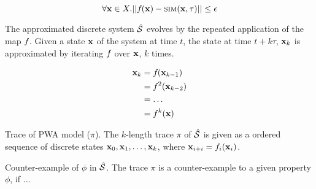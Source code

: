 \begin{equation}
    \forall \mathbf{x} \in X.
        ||f_{}(\mathbf{x}) - \mbox{\sc sim}(\mathbf{x}, \tau)|| \le \epsilon
\end{equation}

The approximated discrete system $\hat{\mathcal{S}}$ evolves by the repeated
application of the map $f_{}$. Given a state $\mathbf{x}$ of the
system at time $t$, the state at time $t + k\tau$, $\mathbf{x}_k$ is
approximated by iterating $f_{}$ over $\mathbf{x}$, $k$ times.

\begin{align}
    \mathbf{x}_k &= f_{}(\mathbf{x}_{k-1}) \nonumber\\
          &= f_{}^2(\mathbf{x}_{k-2}) \nonumber\\
          &= \ldots \nonumber\\
          &= f_{}^k(\mathbf{x})
\end{align}

\begin{definition}{Trace of PWA model ($\pi$)}. The $k$-length trace
$\pi$ of $\hat{\mathcal{S}}$ is given as a ordered sequence of discrete
states $\mathbf{x}_0, \mathbf{x}_1, \ldots, \mathbf{x}_k$, where $\mathbf{x}_{i+i} = f_{i}(\mathbf{x}_i)$.
\end{definition}

\begin{definition}{Counter-example of $\phi$ in $\hat{\mathcal{S}}$}. The trace $\pi$ is a
    counter-example to a given property $\phi$, if ...
\end{definition}


